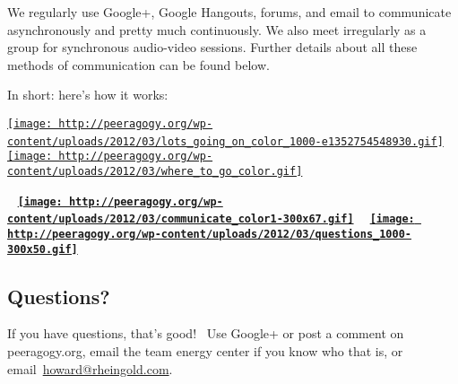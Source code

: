 We regularly use Google+, Google Hangouts, forums, and email to
communicate asynchronously and pretty much continuously. We also meet
irregularly as a group for synchronous audio-video sessions. Further
details about all these methods of communication can be found below.

In short: here's how it works:

\href{http://peeragogy.org/wp-content/uploads/2012/03/lots_going_on_color_1000.gif}{\texttt{[image: http://peeragogy.org/wp-content/uploads/2012/03/lots\_going\_on\_color\_1000-e1352754548930.gif]}}
~
\href{http://peeragogy.org/wp-content/uploads/2012/03/where_to_go_color.gif}{\texttt{[image: http://peeragogy.org/wp-content/uploads/2012/03/where\_to\_go\_color.gif]}}


~
\textbf{\href{http://peeragogy.org/wp-content/uploads/2012/03/communicate_color1.gif}{\texttt{[image: http://peeragogy.org/wp-content/uploads/2012/03/communicate\_color1-300x67.gif]}}}
\textbf{~
\href{http://peeragogy.org/wp-content/uploads/2012/03/questions_1000.gif}{\texttt{[image: http://peeragogy.org/wp-content/uploads/2012/03/questions\_1000-300x50.gif]}}}

\subsection{Questions?}

If you have questions, that's good!~ Use Google+ or post a comment on
peeragogy.org, email the team energy center if you know who that is, or
email~\href{mailto:howard@rheingold.com}{howard@rheingold.com}.
